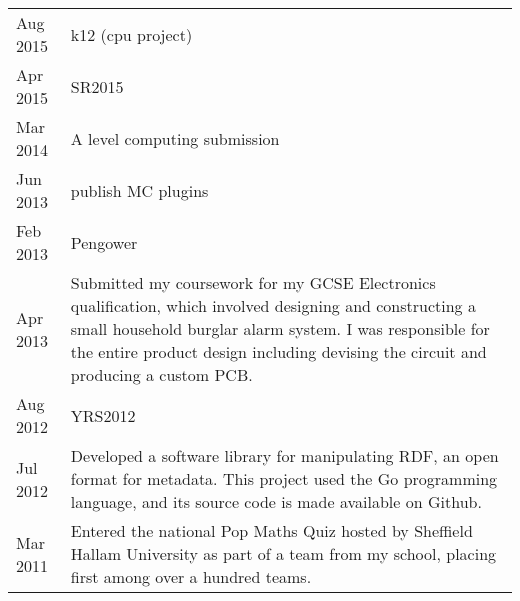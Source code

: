 

{
\setlength{\extrarowheight}{.7em}
\begin{tabu} to \textwidth {X[1,l] X[8,l]}
    Aug 2015 & k12 (cpu project) \\
    Apr 2015 & SR2015 \\
    Mar 2014 & A level computing submission \\
    Jun 2013 & publish MC plugins \\
    Feb 2013 & Pengower \\
    Apr 2013 & Submitted my coursework for my GCSE Electronics qualification, which involved designing and constructing a small household burglar alarm system. I was responsible for the entire product design including devising the circuit and producing a custom PCB. \\
    Aug 2012 & YRS2012 \\
    Jul 2012 & Developed a software library for manipulating RDF, an open format for metadata. This project used the Go programming language, and its source code is made available on Github. \\
    Mar 2011 & Entered the national Pop Maths Quiz hosted by Sheffield Hallam University as part of a team from my school, placing first among over a hundred teams. \\
\end{tabu}
}
